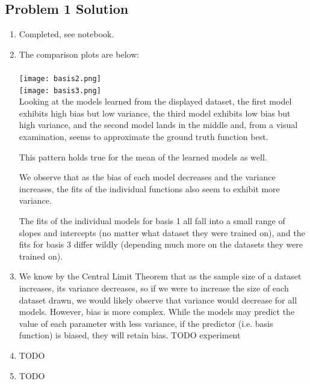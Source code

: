 \documentclass[submit]{harvardml}
\begin{document}
\subsection*{Problem 1 Solution}
\begin{enumerate}
    \item Completed, see notebook.
    \item The comparison plots are below:\\
       \\
      \texttt{[image: basis2.png]}\\
      \texttt{[image: basis3.png]}\\
      Looking at the models learned from the displayed dataset, the first model exhibits high bias but low variance, the third model exhibits low bias but high variance, and the second model lands in the middle and, from a visual examination, seems to approximate the ground truth function best. 
      
      This pattern holds true for the mean of the learned models as well.

      We observe that as the bias of each model decreases and the variance increases, the fits of the individual functions also seem to exhibit more variance. 
      
      The fits of the individual models for basis 1 all fall into a small range of slopes and intercepts (no matter what dataset they were trained on), and the fits for basis 3 differ wildly (depending much more on the datasets they were trained on).
      
    \item We know by the Central Limit Theorem that as the sample size of a dataset increases, its variance decreases, so if we were to increase the size of each dataset drawn, we would likely observe that variance would decrease for all models. However, bias is more complex. While the models may predict the value of each parameter with less variance, if the predictor (i.e. basis function) is biased, they will retain bias. TODO experiment 
    
    \item TODO 
    \item TODO 
\end{enumerate}
\color{black}

\end{document}
